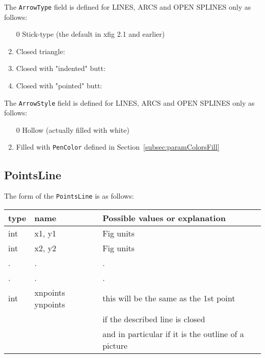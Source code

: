 \documentclass[10pt, a4paper]{article}
\begin{document}
The {\tt ArrowType} field is defined for LINES, ARCS and OPEN SPLINES only as follows:
%
\begin{enumerate}
\item[0] Stick-type (the default in xfig 2.1 and earlier)
\item    Closed triangle:
 \item   Closed with "indented" butt:
\item    Closed with "pointed" butt:
\end{enumerate}


The {\tt ArrowStyle} field is defined for LINES, ARCS and OPEN SPLINES only 
as follows:
%
\begin{enumerate}
\item[0] Hollow (actually filled with white)
\item    Filled with {\tt PenColor} defined in Section~\ref{subsec:paramColorsFill}
\end{enumerate}


\subsection{PointsLine}\label{subsec:paramPointsLine}

\noindent
The form of the {\tt PointsLine} is as follows: \\
%
\begin{tabular}{|lll|}
\hline
type & name  & Possible values or explanation \\
\hline
\hline
int & x1, y1 & Fig units \\
int & x2, y2 & Fig units \\
  . &  .     &  .    \\
  . &  .     &  .    \\
int & xnpoints ynpoints & this will be the same as the 1st point \\
    &                   & if the described line is closed \\
    &                   & and in particular if it is the outline of a picture \\
\hline
\end{tabular}
\end{document}
